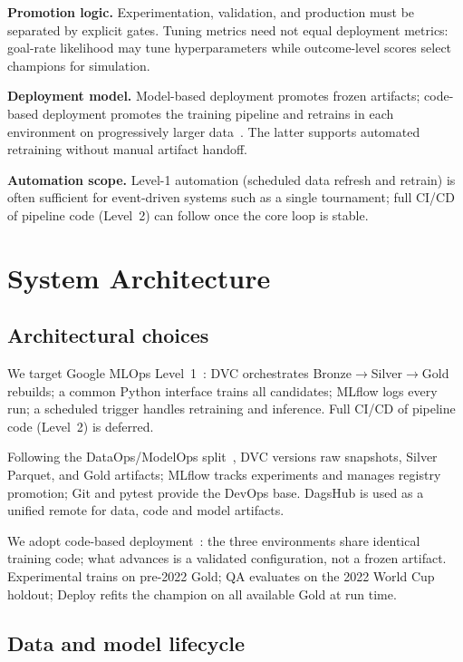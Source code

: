 \documentclass[conference]{IEEEtran}
\begin{document}
\textbf{Promotion logic.}
Experimentation, validation, and production must be separated by explicit gates.
Tuning metrics need not equal deployment metrics: goal-rate likelihood may tune
hyperparameters while outcome-level scores select champions for simulation.

\textbf{Deployment model.}
Model-based deployment promotes frozen artifacts; code-based deployment promotes
the training pipeline and retrains in each environment on progressively larger
data~\cite{databricks_bigbook}.
The latter supports automated retraining without manual artifact handoff.

\textbf{Automation scope.}
Level-1 automation (scheduled data refresh and retrain) is often sufficient for
event-driven systems such as a single tournament; full CI/CD of pipeline code
(Level~2) can follow once the core loop is stable.

\section{System Architecture}
\label{sec:architecture}

\subsection{Architectural choices}

We target Google MLOps Level~1~\cite{google_mlops}: DVC orchestrates
Bronze$\to$Silver$\to$Gold rebuilds; a common Python interface trains all
candidates; MLflow logs every run; a scheduled trigger handles retraining and
inference.
Full CI/CD of pipeline code (Level~2) is deferred.

Following the DataOps/ModelOps split~\cite{databricks_bigbook,ossara2023},
DVC versions raw snapshots, Silver Parquet, and Gold artifacts;
MLflow tracks experiments and manages registry promotion;
Git and pytest provide the DevOps base.
DagsHub is used as a unified remote for data, code and model artifacts.

We adopt code-based deployment~\cite{databricks_bigbook}: the three
environments share identical training code; what advances is a validated
configuration, not a frozen artifact.
Experimental trains on pre-2022 Gold; QA evaluates on the 2022 World Cup holdout;
Deploy refits the champion on all available Gold at run time.

\subsection{Data and model lifecycle}
\end{document}
